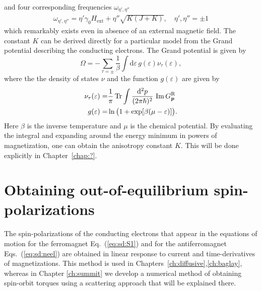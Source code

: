and four corresponding frequencies $\omega_{\eta',\eta''}$  
\begin{align}
    \omega_{\eta',\eta''} = \eta' \gamma_0 H_\text{ext} +\eta'' \sqrt{K(J+K)}, \quad \eta',\eta''=\pm1
\end{align}
which remarkably exists even in absence of an external magnetic field. The constant $K$ can be derived directly for a particular model from the Grand potential describing the conducting electrons. The Grand potential is given by
\begin{equation}
    \Omega = - \sum_{\tau=\pm}\frac{1}{\beta} \int \mathrm{d}\varepsilon\,g(\varepsilon) \nu_\tau(\varepsilon),
    \label{b1}
\end{equation}
where the the density of states $\nu$ and the function $g(\varepsilon)$ are given by
\begin{align}
    \nu_\tau(\varepsilon) = & \frac{1}{\pi} \operatorname{Tr} \int \frac{\mathrm{d}^2p}{(2\pi\hslash)^2}\,\operatorname{Im} G^\text{R}_{\boldsymbol{p}}\\
    g(\varepsilon) = & \mathop{\mathrm{ln}}\nolimits \big(1+\exp[\beta(\mu-\varepsilon)]\big).
    \label{eq:nu}
\end{align}
Here $\beta$ is the inverse temperature and $\mu$ is the chemical potential. By evaluating the integral and expanding around the energy minimum in powers of magnetization, one can obtain the anisotropy constant $K$. This will be done explicitly in Chapter~\ref{chap:?}.

\section{Obtaining out-of-equilibrium spin-polarizations}
The spin-polarizations of the conducting electrons that appear in the equations of motion for the ferromagnet Eq.~(\ref{eq:sd:S1}) and for the antiferromagnet Eqs.~(\ref{eq:sd:neel}) are obtained in linear response to current and time-derivatives of magnetizations. This method is used in Chapters~\ref{ch:diffusive},\ref{ch:baglay}, whereas in Chapter \ref{ch:summit} we develop a numerical method of obtaining spin-orbit torques using a scattering approach that will be explained there. 

